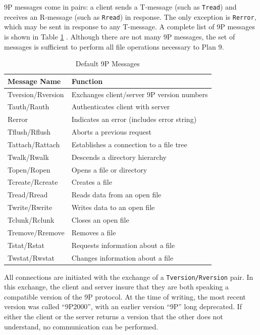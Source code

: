 \documentclass[11pt,american]{report}
\begin{document}
9P messages come in pairs: a client sends a T-message (such as {\tt Tread}) and receives an R-message (such as {\tt Rread}) in response. The only exception is {\tt Rerror}, which may be sent in response to any T-message. A complete list of 9P messages is shown in Table \ref{table:9P} \cite{5intro}. Although there are not many 9P messages, the set of messages is sufficient to perform all file operations necessary to Plan 9.

\begin{table}[h]
\caption{Default 9P Messages}
\begin{center}
	\begin{tabular}{ | l | l | }
		\hline
		\bf{Message Name} & \bf{Function} \\ \hline
		Tversion/Rversion & Exchanges client/server 9P version numbers \\ \hline
		Tauth/Rauth & Authenticates client with server \\ \hline
		Rerror & Indicates an error (includes error string) \\ \hline
		Tflush/Rflush & Aborts a previous request \\ \hline
		Tattach/Rattach & Establishes a connection to a file tree \\ \hline
		Twalk/Rwalk & Descends a directory hierarchy \\ \hline
		Topen/Ropen & Opens a file or directory \\ \hline
		Tcreate/Rcreate & Creates a file \\ \hline
		Tread/Rread & Reads data from an open file \\ \hline
		Twrite/Rwrite & Writes data to an open file \\ \hline
		Tclunk/Rclunk & Closes an open file \\ \hline
		Tremove/Rremove & Removes a file \\ \hline
		Tstat/Rstat & Requests information about a file \\ \hline
		Twstat/Rwstat & Changes information about a file \\ \hline
	\end{tabular}
\end{center}
\label{table:9P}
\end{table}

All connections are initiated with the exchange of a {\tt Tversion/Rversion} pair. In this exchange, the client and server insure that they are both speaking a compatible version of the 9P protocol. At the time of writing, the most recent version was called ``9P2000'', with an earlier version ``9P'' long deprecated. If either the client or the server returns a version that the other does not understand, no communication can be performed.
\end{document}
